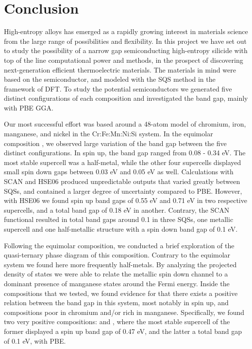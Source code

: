 \documentclass[UKenglish]{ifimaster}  %
\begin{document}
\chapter{Conclusion}

High-entropy alloys has emerged as a rapidly growing interest in materials science from the large range of possibilities and flexibility. In this project we have set out to study the possibility of a narrow gap semiconducting high-entropy silicide with top of the line computational power and methods, in the prospect of discovering next-generation efficient thermoelectric materials. The materials in mind were based on the  semiconductor, and modeled with the SQS method in the framework of DFT. To study the potential semiconductors we generated five distinct configurations of each composition and investigated the band gap, mainly with PBE GGA.  

Our most successful effort was based around a 48-atom model of chromium, iron, manganese, and nickel in the Cr:Fe:Mn:Ni:Si system. In the equimolar composition , we observed large variation of the band gap between the five distinct configurations. In spin up, the band gap ranged from 0.08 - 0.34 eV. The most stable supercell was a half-metal, while the other four supercells displayed small spin down gaps between 0.03 eV and 0.05 eV as well. Calculations with SCAN and HSE06 produced unpredictable outputs that varied greatly between SQSs, and contained a larger degree of uncertainty compared to PBE. However, with HSE06 we found spin up band gaps of 0.55 eV and 0.71 eV in two respective supercells, and a total band gap of 0.18 eV in another. Contrary, the SCAN functional resulted in total band gaps around 0.1 in three SQSs, one metallic supercell and one half-metallic structure with a spin down band gap of 0.1 eV.   

Following the equimolar composition, we conducted a brief exploration of the quasi-ternary phase diagram of this composition. Contrary to the equimolar system we found here more frequently half-metals. By analyzing the projected density of states we were able to relate the metallic spin down channel to a dominant presence of manganese states around the Fermi energy.  Inside the compositions that we tested, we found evidence for that there exists a positive relation between the band gap in this system, most notably in spin up, and compositions poor in chromium and/or rich in manganese. Specifically, we found two very positive compositions:  and , where the most stable supercell of the former displayed a spin up band gap of 0.47 eV, and the latter a total band gap of 0.1 eV, with PBE.
\end{document}
